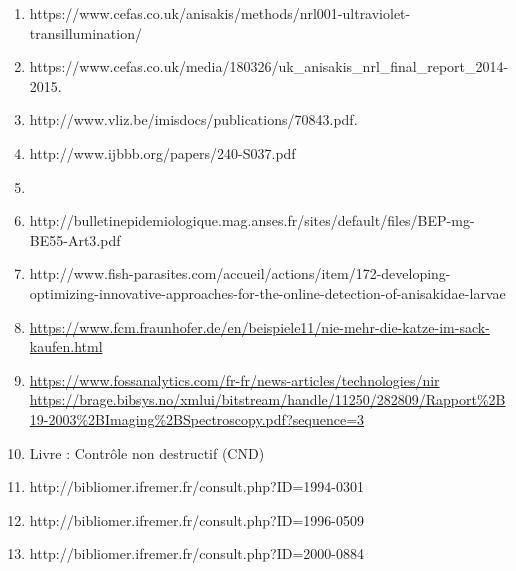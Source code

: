 \documentclass[12pt,a4paper]{article}
\begin{document}
\begin{enumerate}
		\item https://www.cefas.co.uk/anisakis/methods/nrl001-ultraviolet-transillumination/
	\item https://www.cefas.co.uk/media/180326/uk\_anisakis\_nrl\_final\_report\_2014-2015.
	\item http://www.vliz.be/imisdocs/publications/70843.pdf.
	\item http://www.ijbbb.org/papers/240-S037.pdf
	\item \item http://bulletinepidemiologique.mag.anses.fr/sites/default/files/BEP-mg-BE55-Art3.pdf
	\item http://www.fish-parasites.com/accueil/actions/item/172-developing-optimizing-innovative-approaches-for-the-online-detection-of-anisakidae-larvae
	\item \href{https://www.fcm.fraunhofer.de/en/beispiele11/nie-mehr-die-katze-im-sack-kaufen.html}{https://www.fcm.fraunhofer.de/en/beispiele11/nie-mehr-die-katze-im-sack-kaufen.html}
	\item \href{https://www.fossanalytics.com/fr-fr/news-articles/technologies/nir}{https://www.fossanalytics.com/fr-fr/news-articles/technologies/nir}
	\href{https://brage.bibsys.no/xmlui/bitstream/handle/11250/282809/Rapport\%2B19-2003\%2BImaging\%2BSpectroscopy.pdf?sequence=3}{https://brage.bibsys.no/xmlui/bitstream/handle/11250/282809/Rapport\%2B19-2003\%2BImaging\%2BSpectroscopy.pdf?sequence=3}
	\item Livre : Contrôle non destructif (CND)
	
	\item http://bibliomer.ifremer.fr/consult.php?ID=1994-0301
	
	\item http://bibliomer.ifremer.fr/consult.php?ID=1996-0509
	
	\item http://bibliomer.ifremer.fr/consult.php?ID=2000-0884

	
\end{enumerate}
\end{document}
